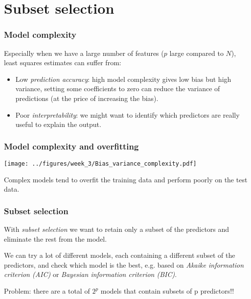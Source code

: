 \documentclass[notes]{beamer}          %
\begin{document}
\section{Subset selection}

\begin{frame}
\frametitle{Model complexity}

Especially when we have a large number of features ($p$ large compared to $N$), least squares estimates can suffer from:

\begin{itemize}
    \item Low \textit{prediction accuracy}: high model complexity gives low bias but high variance, setting some coefficients to zero can reduce the variance of predictions (at the price of increasing the bias).
    \item Poor \textit{interpretability}: we might want to identify which predictors are really useful to explain the output.
\end{itemize}

\end{frame}

\begin{frame}
\frametitle{Model complexity and overfitting}

\begin{center}
\texttt{[image: ../figures/week\_3/Bias\_variance\_complexity.pdf]}
\end{center}

Complex models tend to overfit the training data and perform poorly on the test data.

\end{frame}



\begin{frame}
\frametitle{Subset selection}

With \textit{subset selection} we want to retain only a subset of the predictors and eliminate the rest from the model.

\vspace{5mm} 

We can try a lot of different models, each containing a different subset of the predictors, and check which model is the best, e.g. based on \textit{Akaike information criterion (AIC)} or \textit{Bayesian information criterion (BIC)}.

\vspace{5mm} 

Problem: there are a total of $2^p$ models that contain subsets of p predictors!!

\end{frame}
\end{document}

